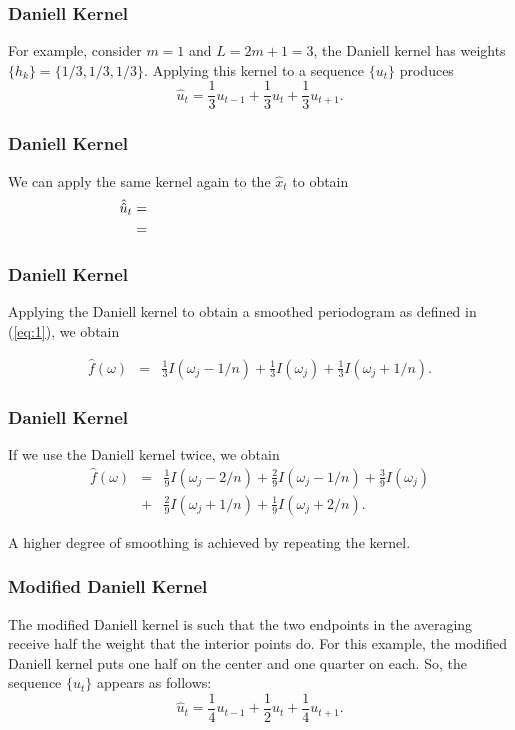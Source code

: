 \documentclass[%
xcolor=pdftex]{beamer}
\begin{document}
\begin{frame}
\frametitle{Daniell Kernel}

For example, consider $m=1$ and
$L=2m+1=3$, the Daniell kernel has weights
$\{h_k\}=\{1/3,1/3,1/3\}.$ Applying this kernel to a sequence
 $\{u_t\}$ produces
$$
\hat{u}_t=\frac{1}{3} u_{t-1}+\frac{1}{3} u_{t}+\frac{1}{3} u_{t+1}.
$$

\end{frame}

\begin{frame}
\frametitle{Daniell Kernel}

We can apply the same kernel again to the $\hat{x}_t$ to obtain
\begin{eqnarray*}
\hat{\hat{u}}_t &=& \hspace{60mm} \\
                &=& \hspace{60mm}
\end{eqnarray*}



\end{frame}

\begin{frame}
\frametitle{Daniell Kernel}

Applying the Daniell kernel to obtain a smoothed periodogram as defined in (\ref{eq:1}), we
obtain

\begin{eqnarray*}
\widehat{f}(\omega) &=& \frac{1}{3} I(\omega_j - 1/n) + \frac{1}{3} I(\omega_j ) + \frac{1}{3} I(\omega_j + 1/n).
\end{eqnarray*}


\end{frame}


\begin{frame}
\frametitle{Daniell Kernel}

If we use the Daniell kernel twice, we obtain
\begin{eqnarray*}
\widehat{f}(\omega) &=& \frac{1}{9} I(\omega_j - 2/n) + \frac{2}{9} I(\omega_j - 1/n) +\frac{3}{9} I(\omega_j ) \\
                    &+& \frac{2}{9} I(\omega_j + 1/n) +\frac{1}{9} I(\omega_j + 2/n).
\end{eqnarray*}

A higher degree of smoothing is achieved by repeating the kernel.

\end{frame}

\begin{frame}[fragile]
\frametitle{Modified Daniell Kernel}

The modified Daniell kernel is such that the two endpoints in the averaging receive half the weight that the interior points do. For this example, the modified Daniell kernel puts one half on the center and one quarter on each. So, the sequence $\{u_t\}$ appears as follows:
$$
\hat{u}_t=\frac{1}{4} u_{t-1}+\frac{1}{2} u_{t}+\frac{1}{4} u_{t+1}.
$$


\end{frame}
\end{document}
